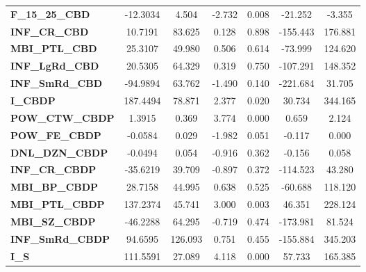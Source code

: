 \begin{center}
\begin{tabular}{lcccccc}
\textbf{F\_15\_25\_CBD}  &     -12.3034  &        4.504     &    -2.732  &         0.008        &      -21.252    &       -3.355     \\
\textbf{INF\_CR\_CBD}    &      10.7191  &       83.625     &     0.128  &         0.898        &     -155.443    &      176.881     \\
\textbf{MBI\_PTL\_CBD}   &      25.3107  &       49.980     &     0.506  &         0.614        &      -73.999    &      124.620     \\
\textbf{INF\_LgRd\_CBD}  &      20.5305  &       64.329     &     0.319  &         0.750        &     -107.291    &      148.352     \\
\textbf{INF\_SmRd\_CBD}  &     -94.9894  &       63.762     &    -1.490  &         0.140        &     -221.684    &       31.705     \\
\textbf{I\_CBDP}         &     187.4494  &       78.871     &     2.377  &         0.020        &       30.734    &      344.165     \\
\textbf{POW\_CTW\_CBDP}  &       1.3915  &        0.369     &     3.774  &         0.000        &        0.659    &        2.124     \\
\textbf{POW\_FE\_CBDP}   &      -0.0584  &        0.029     &    -1.982  &         0.051        &       -0.117    &        0.000     \\
\textbf{DNL\_DZN\_CBDP}  &      -0.0494  &        0.054     &    -0.916  &         0.362        &       -0.156    &        0.058     \\
\textbf{INF\_CR\_CBDP}   &     -35.6219  &       39.709     &    -0.897  &         0.372        &     -114.523    &       43.280     \\
\textbf{MBI\_BP\_CBDP}   &      28.7158  &       44.995     &     0.638  &         0.525        &      -60.688    &      118.120     \\
\textbf{MBI\_PTL\_CBDP}  &     137.2374  &       45.741     &     3.000  &         0.003        &       46.351    &      228.124     \\
\textbf{MBI\_SZ\_CBDP}   &     -46.2288  &       64.295     &    -0.719  &         0.474        &     -173.981    &       81.524     \\
\textbf{INF\_SmRd\_CBDP} &      94.6595  &      126.093     &     0.751  &         0.455        &     -155.884    &      345.203     \\
\textbf{I\_S}            &     111.5591  &       27.089     &     4.118  &         0.000        &       57.733    &      165.385     \\

\end{tabular}
\end{center}
